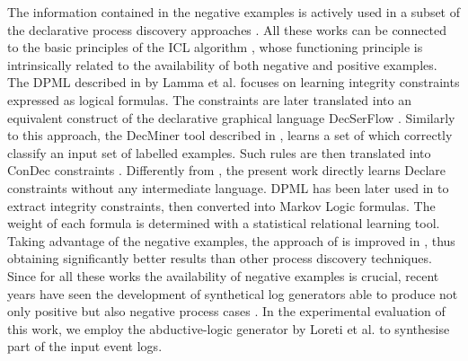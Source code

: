 The information contained in the negative examples is actively used in a subset of the declarative process discovery approaches \cite{2007-Lamma,2009-Chesani,2010-Bellodi,2016-Bellodi}. All these works can be connected to the basic principles of the \ac{ICL} algorithm \cite{1995-DaRaedt}, whose functioning principle is intrinsically related to the availability of both negative and positive examples. 
The \ac{DPML} described in \cite{2007-Lamma, 2007b-Lamma} by Lamma et al. focuses on learning integrity constraints expressed as logical formulas. The constraints are later translated into an equivalent construct of the declarative graphical language DecSerFlow \cite{2006-Aalst}. Similarly to this approach, the DecMiner tool described in \cite{2009-Chesani}, learns a set of  \cite{2008-Alberti} which correctly classify an input set of labelled examples. Such rules are then translated into ConDec constraints \cite{2006-Pesic}. Differently from \cite{2009-Chesani}, the present work directly learns Declare constraints without any intermediate language.
\ac{DPML} has been later used in \cite{2010-Bellodi} to extract integrity constraints, then converted into Markov Logic formulas. The weight of each formula is determined with a statistical relational learning tool. %
Taking advantage of the negative examples, the approach of \cite{2010-Bellodi}  is improved in \cite{2016-Bellodi}, thus obtaining significantly better results than other process discovery techniques. 
Since for all these works the availability of negative examples is crucial, recent years have seen the development of synthetical log generators able to produce not only positive but also negative process cases \cite{2019-Chesani,2017-Chesani,2020-Loreti,2009-Goedertier, 2014-Stocker, 2010-Hee}. In the experimental evaluation of this work, we employ the abductive-logic generator by Loreti et al. \cite{2020-Loreti} to synthesise part of the input event logs.
 
